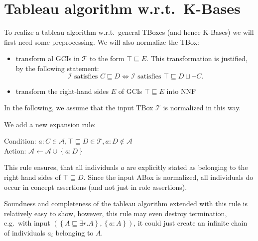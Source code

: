 \section{Tableau algorithm w.r.t.\ K-Bases}
To realize a tableau algorithm w.r.t.\ general TBoxes (and hence K-Bases) we will first need some preprocessing.
We will also normalize the TBox:
\begin{itemize}
	\item transform al GCIs in $\mathcal{T}$ to the form $\top \sqsubseteq E$.
		This transformation is justified, by the following statement:
		\[
		\mathcal{I} \text{ satisfies } C \sqsubseteq D \iff \mathcal{I} \text{ satisfies } \top \sqsubseteq D \sqcup \neg C
		.\]
	\item transform the right-hand sides $E$ of GCIs $\top \sqsubseteq E$ into NNF
\end{itemize}
In the following, we assume that the input TBox $\mathcal{T}$ is normalized in this way.

We add a new expansion rule:
\begin{mdframed}[frametitle= The $\sqsubseteq$-rule, nobreak = true]
	Condition: $a : C \in \mathcal{A}, \top \sqsubseteq D \in \mathcal{T}, a : D \notin \mathcal{A}$\\
	Action: $\mathcal{A} \leftarrow \mathcal{A} \cup \left\{ a: D \right\}$
\end{mdframed}
\begin{note}
	This rule ensures, that all individuals $a$ are explicitly stated as belonging to the right hand sides of $\top \sqsubseteq D$.
	Since the input ABox is normalized, all individuals do occur in concept assertions (and not just in role assertions).
\end{note}

Soundness and completeness of the tableau algorithm extended with this rule is relatively easy to show,
however, this rule may even destroy termination,
e.g.\ with input $(\left\{ A \sqsubseteq \exists r.A \right\}, \left\{ a :A \right\})$, it could just create an infinite chain of individuals $a_i$ belonging to  $A$.
